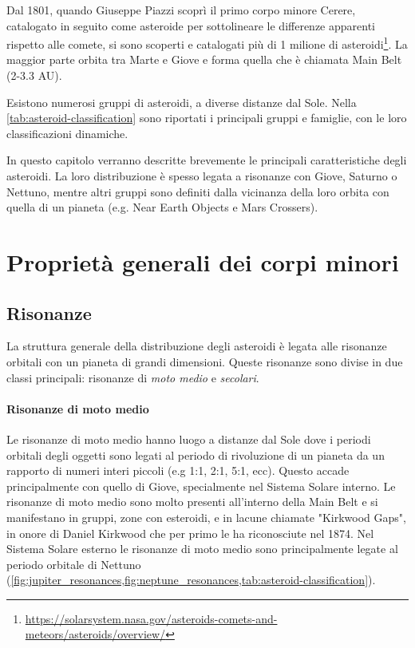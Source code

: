 Dal 1801, quando Giuseppe Piazzi scoprì il primo corpo minore Cerere, catalogato in seguito come asteroide per sottolineare le differenze apparenti rispetto alle comete, si sono scoperti e catalogati più di 1 milione di asteroidi\footnote{\href{https://solarsystem.nasa.gov/asteroids-comets-and-meteors/asteroids/overview/}{https://solarsystem.nasa.gov/asteroids-comets-and-meteors/asteroids/overview/}}. La maggior parte orbita tra Marte e Giove e forma quella che è chiamata Main Belt (2-3.3 AU).

Esistono numerosi gruppi di asteroidi, a diverse distanze dal Sole. Nella \cref{tab:asteroid-classification} sono riportati i principali gruppi e famiglie, con le loro classificazioni dinamiche.

In questo capitolo verranno descritte brevemente le principali caratteristiche degli asteroidi. La loro distribuzione è spesso legata a risonanze con Giove, Saturno o Nettuno, mentre altri gruppi sono definiti dalla vicinanza della loro orbita con quella di un pianeta (e.g. Near Earth Objects e Mars Crossers).

\section{Proprietà generali dei corpi minori}


\subsection{Risonanze}
La struttura generale della distribuzione degli asteroidi è legata alle risonanze orbitali con un pianeta di grandi dimensioni. Queste risonanze sono divise in due classi principali: risonanze di \textit{moto medio} e \textit{secolari}.

\paragraph*{Risonanze di moto medio} 
Le risonanze di moto medio hanno luogo a distanze dal Sole dove i periodi orbitali degli oggetti sono legati al periodo di rivoluzione di un pianeta da un rapporto di numeri interi piccoli (e.g 1:1, 2:1, 5:1, ecc). Questo accade principalmente con quello di Giove, specialmente nel Sistema Solare interno. Le risonanze di moto medio sono molto presenti all'interno della Main Belt e si manifestano in gruppi, zone con esteroidi, e in lacune chiamate "Kirkwood Gaps", in onore di Daniel Kirkwood che per primo le ha riconosciute nel 1874. Nel Sistema Solare esterno le risonanze di moto medio sono principalmente legate al periodo orbitale di Nettuno %
 (\cref{fig:jupiter_resonances,fig:neptune_resonances,tab:asteroid-classification}).

